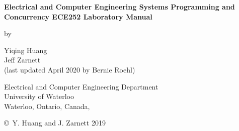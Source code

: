 \pagestyle{empty}

\begin{titlepage}
        \begin{center}
        \vspace*{1.0cm}

        \Huge
        {\bf Electrical and Computer Engineering Systems Programming and Concurrency ECE252 Laboratory Manual}

        \vspace*{1.0cm}

        \normalsize
        by \\

        \vspace*{1.0cm}

        \Large
        Yiqing Huang \\
        Jeff Zarnett \\
        (last updated April 2020 by Bernie Roehl)

        \vspace*{3.0cm}

        \normalsize
        Electrical and Computer Engineering Department \\
        University of Waterloo \\ 

        \vspace*{2.0cm}
\makeatletter
        Waterloo, Ontario, Canada, \@date \\
\makeatother
        
      
        
        \vspace*{1.0cm}

        \copyright\ Y. Huang and J. Zarnett 2019 \\
        \end{center}
\end{titlepage}

\pagestyle{plain}
\setcounter{page}{2}

\cleardoublepage %

